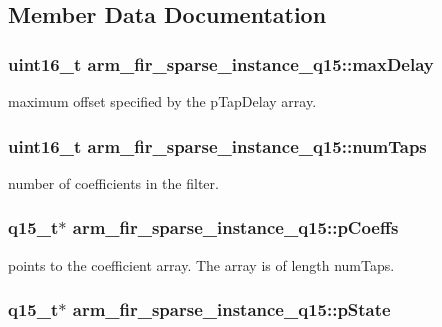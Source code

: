 \subsection{Member Data Documentation}
\hypertarget{structarm__fir__sparse__instance__q15_ad14cc1070eecf7e1926d8f67a8273182}{
\subsubsection[{max\-Delay}]{\setlength{\rightskip}{0pt plus 5cm}uint16\-\_\-t arm\-\_\-fir\-\_\-sparse\-\_\-instance\-\_\-q15\-::max\-Delay}}\label{structarm__fir__sparse__instance__q15_ad14cc1070eecf7e1926d8f67a8273182}
maximum offset specified by the p\-Tap\-Delay array. \hypertarget{structarm__fir__sparse__instance__q15_a0f66b126dd8b85f7467cfb01b7bc4d77}{
\subsubsection[{num\-Taps}]{\setlength{\rightskip}{0pt plus 5cm}uint16\-\_\-t arm\-\_\-fir\-\_\-sparse\-\_\-instance\-\_\-q15\-::num\-Taps}}\label{structarm__fir__sparse__instance__q15_a0f66b126dd8b85f7467cfb01b7bc4d77}
number of coefficients in the filter. \hypertarget{structarm__fir__sparse__instance__q15_a78a6565473b5f0b8c77c3f0f58a76069}{
\subsubsection[{p\-Coeffs}]{\setlength{\rightskip}{0pt plus 5cm}q15\-\_\-t$\ast$ arm\-\_\-fir\-\_\-sparse\-\_\-instance\-\_\-q15\-::p\-Coeffs}}\label{structarm__fir__sparse__instance__q15_a78a6565473b5f0b8c77c3f0f58a76069}
points to the coefficient array. The array is of length num\-Taps. \hypertarget{structarm__fir__sparse__instance__q15_a98b92b0f5208110129b9a67b1db90408}{
\subsubsection[{p\-State}]{\setlength{\rightskip}{0pt plus 5cm}q15\-\_\-t$\ast$ arm\-\_\-fir\-\_\-sparse\-\_\-instance\-\_\-q15\-::p\-State}}\label{structarm__fir__sparse__instance__q15_a98b92b0f5208110129b9a67b1db90408}
